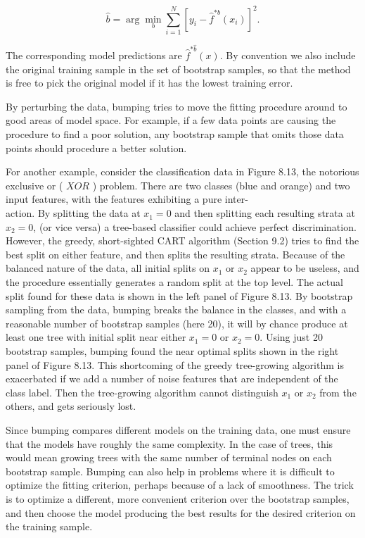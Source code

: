 \documentclass[10pt]{article}
\begin{document}
\begin{equation*}
\hat{b}=\arg \min _{b} \sum_{i=1}^{N}\left[y_{i}-\hat{f}^{* b}\left(x_{i}\right)\right]^{2} . \tag{8.60}
\end{equation*}


The corresponding model predictions are $\hat{f}^{* \hat{b}}(x)$. By convention we also include the original training sample in the set of bootstrap samples, so that the method is free to pick the original model if it has the lowest training error.

By perturbing the data, bumping tries to move the fitting procedure around to good areas of model space. For example, if a few data points are causing the procedure to find a poor solution, any bootstrap sample that omits those data points should procedure a better solution.

For another example, consider the classification data in Figure 8.13, the notorious exclusive or ( $X O R$ ) problem. There are two classes (blue and orange) and two input features, with the features exhibiting a pure inter-\\
action. By splitting the data at $x_{1}=0$ and then splitting each resulting strata at $x_{2}=0$, (or vice versa) a tree-based classifier could achieve perfect discrimination. However, the greedy, short-sighted CART algorithm (Section 9.2) tries to find the best split on either feature, and then splits the resulting strata. Because of the balanced nature of the data, all initial splits on $x_{1}$ or $x_{2}$ appear to be useless, and the procedure essentially generates a random split at the top level. The actual split found for these data is shown in the left panel of Figure 8.13. By bootstrap sampling from the data, bumping breaks the balance in the classes, and with a reasonable number of bootstrap samples (here 20), it will by chance produce at least one tree with initial split near either $x_{1}=0$ or $x_{2}=0$. Using just 20 bootstrap samples, bumping found the near optimal splits shown in the right panel of Figure 8.13. This shortcoming of the greedy tree-growing algorithm is exacerbated if we add a number of noise features that are independent of the class label. Then the tree-growing algorithm cannot distinguish $x_{1}$ or $x_{2}$ from the others, and gets seriously lost.

Since bumping compares different models on the training data, one must ensure that the models have roughly the same complexity. In the case of trees, this would mean growing trees with the same number of terminal nodes on each bootstrap sample. Bumping can also help in problems where it is difficult to optimize the fitting criterion, perhaps because of a lack of smoothness. The trick is to optimize a different, more convenient criterion over the bootstrap samples, and then choose the model producing the best results for the desired criterion on the training sample.
\end{document}
